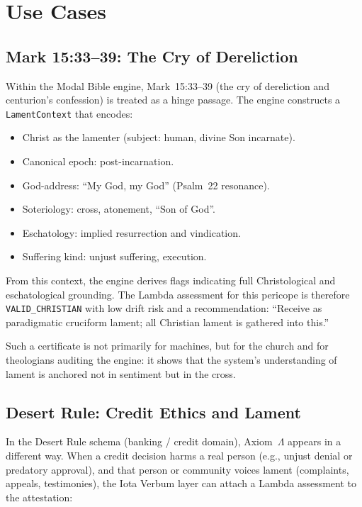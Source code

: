 \documentclass[11pt]{article}
\begin{document}
\section{Use Cases}

\subsection{Mark 15:33--39: The Cry of Dereliction}

Within the Modal Bible engine, Mark~15:33--39 (the cry of dereliction and centurion's confession) is treated as a hinge passage. The engine constructs a \texttt{LamentContext} that encodes:

\begin{itemize}
  \item Christ as the lamenter (subject: human, divine Son incarnate).
  \item Canonical epoch: post-incarnation.
  \item God-address: ``My God, my God'' (Psalm~22 resonance).
  \item Soteriology: cross, atonement, ``Son of God''.
  \item Eschatology: implied resurrection and vindication.
  \item Suffering kind: unjust suffering, execution.
\end{itemize}

From this context, the engine derives flags indicating full Christological and eschatological grounding. The Lambda assessment for this pericope is therefore \texttt{VALID\_CHRISTIAN} with low drift risk and a recommendation: ``Receive as paradigmatic cruciform lament; all Christian lament is gathered into this.''

Such a certificate is not primarily for machines, but for the church and for theologians auditing the engine: it shows that the system's understanding of lament is anchored not in sentiment but in the cross.

\subsection{Desert Rule: Credit Ethics and Lament}

In the Desert Rule schema (banking / credit domain), Axiom~$\Lambda$ appears in a different way. When a credit decision harms a real person (e.g., unjust denial or predatory approval), and that person or community voices lament (complaints, appeals, testimonies), the Iota Verbum layer can attach a Lambda assessment to the attestation:
\end{document}
